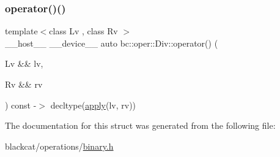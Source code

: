 \mbox{\label{structbc_1_1oper_1_1Div_ad2f58ef903e222b4046352e9c948efab}} 
\subsubsection{\texorpdfstring{operator()()}{operator()()}}
{\footnotesize\ttfamily template$<$class Lv , class Rv $>$ \\
\+\_\+\+\_\+host\+\_\+\+\_\+ \+\_\+\+\_\+device\+\_\+\+\_\+ auto bc\+::oper\+::\+Div\+::operator() (\begin{DoxyParamCaption}\item[{Lv \&\&}]{lv,  }\item[{Rv \&\&}]{rv }\end{DoxyParamCaption}) const -\/$>$ decltype(\hyperlink{structbc_1_1oper_1_1Div_a1a74024477b64871a072d6861a3a0c44}{apply}(lv, rv)) \hspace{0.3cm}{\ttfamily [inline]}}



The documentation for this struct was generated from the following file\+:\begin{DoxyCompactItemize}
\item 
blackcat/operations/\hyperlink{binary_8h}{binary.\+h}\end{DoxyCompactItemize}
